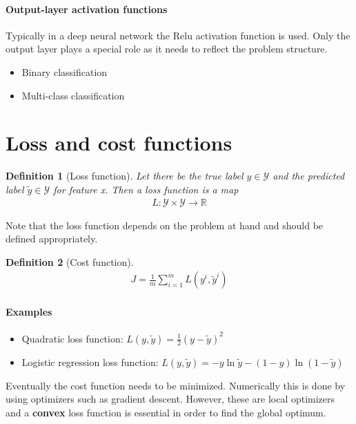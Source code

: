 \documentclass[12pt,a4paper]{article}
\newtheorem{definition}{Definition}
\begin{document}
\paragraph{Output-layer activation functions}
Typically in a deep neural network the Relu activation function is used. Only the output layer plays a special role as it needs to reflect the problem structure. 
\begin{itemize}	\setlength\itemsep{0em}
	\item Binary classification 
	\item Multi-class classification
\end{itemize}

\section{Loss and cost functions}
\begin{definition}[Loss function] Let there be the true label $y \in \mathcal Y$ and the predicted label $\tilde y \in \mathcal Y$ for feature x.
Then a loss function is a map
\begin{align*}
L: \mathcal Y \times \mathcal Y \rightarrow \mathbb R
\end{align*}
\end{definition}
Note that the loss function depends on the problem at hand and should be defined appropriately.
\begin{definition}[Cost function] 
\begin{align*}
J = \frac{1}{m}\sum_{i=1} ^m L (y^i, \tilde{y}^i)  
\end{align*} 
\end{definition}

\paragraph*{Examples}
\begin{itemize}
\item Quadratic loss function: $L(y, \tilde y) = \frac{1}{2}(y-\tilde{y})^2$
\item Logistic regression loss function: $L(y, \tilde y) = - y\ln \tilde y - (1-y)\ln (1 - \tilde y)$
\end{itemize}
Eventually the cost function needs to be minimized. Numerically this is done by using optimizers such as gradient descent. However, these are local optimizers and a \textbf{convex} loss function is essential in order to find the global optimum.
\end{document}
